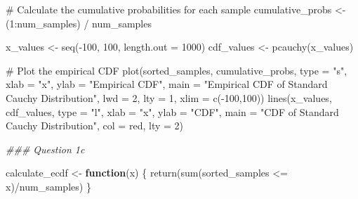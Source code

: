 \documentclass[
  letterpaper,
  DIV=11,
  numbers=noendperiod]{scrartcl}
\newenvironment{Shaded}{\begin{snugshade}}{\end{snugshade}}
\newcommand{\AttributeTok}[1]{\textcolor[rgb]{0.40,0.45,0.13}{#1}}
\newcommand{\CommentTok}[1]{\textcolor[rgb]{0.37,0.37,0.37}{#1}}
\newcommand{\ControlFlowTok}[1]{\textcolor[rgb]{0.00,0.23,0.31}{\textbf{#1}}}
\newcommand{\DecValTok}[1]{\textcolor[rgb]{0.68,0.00,0.00}{#1}}
\newcommand{\DocumentationTok}[1]{\textcolor[rgb]{0.37,0.37,0.37}{\textit{#1}}}
\newcommand{\FunctionTok}[1]{\textcolor[rgb]{0.28,0.35,0.67}{#1}}
\newcommand{\NormalTok}[1]{\textcolor[rgb]{0.00,0.23,0.31}{#1}}
\newcommand{\OtherTok}[1]{\textcolor[rgb]{0.00,0.23,0.31}{#1}}
\newcommand{\SpecialCharTok}[1]{\textcolor[rgb]{0.37,0.37,0.37}{#1}}
\newcommand{\StringTok}[1]{\textcolor[rgb]{0.13,0.47,0.30}{#1}}
\begin{document}
\begin{Shaded}
\begin{Highlighting}[]
\CommentTok{\# Calculate the cumulative probabilities for each sample}
\NormalTok{cumulative\_probs }\OtherTok{\textless{}{-}}\NormalTok{ (}\DecValTok{1}\SpecialCharTok{:}\NormalTok{num\_samples) }\SpecialCharTok{/}\NormalTok{ num\_samples}

\NormalTok{x\_values }\OtherTok{\textless{}{-}} \FunctionTok{seq}\NormalTok{(}\SpecialCharTok{{-}}\DecValTok{100}\NormalTok{, }\DecValTok{100}\NormalTok{,  }\AttributeTok{length.out =} \DecValTok{1000}\NormalTok{)}
\NormalTok{cdf\_values }\OtherTok{\textless{}{-}} \FunctionTok{pcauchy}\NormalTok{(x\_values)}

\CommentTok{\# Plot the empirical CDF}
\FunctionTok{plot}\NormalTok{(sorted\_samples, }
\NormalTok{     cumulative\_probs, }
     \AttributeTok{type =} \StringTok{"s"}\NormalTok{, }
     \AttributeTok{xlab =} \StringTok{"x"}\NormalTok{, }
     \AttributeTok{ylab =} \StringTok{"Empirical CDF"}\NormalTok{, }
     \AttributeTok{main =} \StringTok{"Empirical CDF of Standard Cauchy Distribution"}\NormalTok{, }
     \AttributeTok{lwd =} \DecValTok{2}\NormalTok{, }\AttributeTok{lty =} \DecValTok{1}\NormalTok{, }\AttributeTok{xlim =} \FunctionTok{c}\NormalTok{(}\SpecialCharTok{{-}}\DecValTok{100}\NormalTok{,}\DecValTok{100}\NormalTok{))}
\FunctionTok{lines}\NormalTok{(x\_values, cdf\_values, }\AttributeTok{type =} \StringTok{"l"}\NormalTok{, }
      \AttributeTok{xlab =} \StringTok{"x"}\NormalTok{, }\AttributeTok{ylab =} \StringTok{"CDF"}\NormalTok{, }\AttributeTok{main =} \StringTok{"CDF of Standard Cauchy Distribution"}\NormalTok{, }
      \AttributeTok{col =} \StringTok{\textquotesingle{}red\textquotesingle{}}\NormalTok{, }\AttributeTok{lty =} \DecValTok{2}\NormalTok{)}

\DocumentationTok{\#\#\# Question 1c}

\NormalTok{calculate\_ecdf }\OtherTok{\textless{}{-}} \ControlFlowTok{function}\NormalTok{(x) \{}
    \FunctionTok{return}\NormalTok{(}\FunctionTok{sum}\NormalTok{(sorted\_samples }\SpecialCharTok{\textless{}=}\NormalTok{ x)}\SpecialCharTok{/}\NormalTok{num\_samples)}
\NormalTok{\}}


\end{Highlighting}
\end{Shaded}
\end{document}
